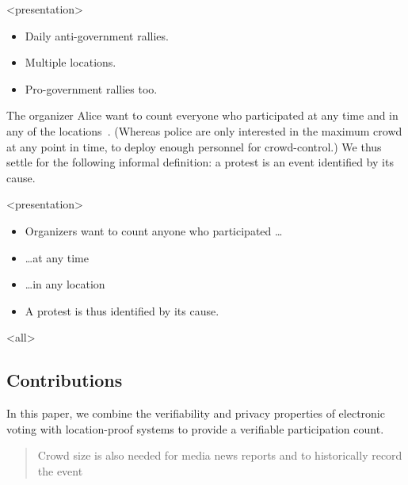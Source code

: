 {\begin{frame}<presentation>
  \begin{example}[Venezuela 2017]
    \begin{itemize}
      \item Daily anti-government rallies.
      \item Multiple locations.
      \item Pro-government rallies too.
    \end{itemize}
  \end{example}
\end{frame}

The organizer Alice want to count everyone who participated at any time and in 
any of the locations~\cite{2016DemonstrationsInSeoul}.
(Whereas police are only interested in the maximum crowd at any point in time, 
to deploy enough personnel for crowd-control.)
We thus settle for the following informal definition:
a protest is an event identified by its cause.

\begin{frame}<presentation>
  \begin{definition}[Informal]
    \begin{itemize}
      \item Organizers want to count anyone who participated \dots
      \item \dots at any time
      \item \dots in any location
      \item A protest is thus identified by its cause.
    \end{itemize}
  \end{definition}
\end{frame}
}

\mode<all>


\subsection<article>{Contributions}

In this paper, we combine the verifiability and privacy properties of 
electronic voting with location-proof systems to provide a verifiable 
participation count.


\blockcquote{HowToEstimateCrowdSize}{%
  Crowd size is also needed for media news reports and to historically record 
  the event%
}


